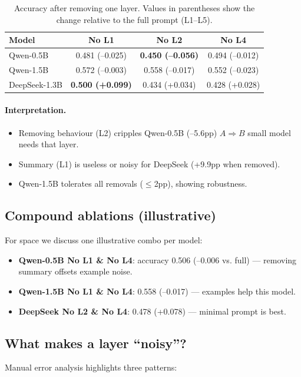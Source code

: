 \documentclass[a4paper]{usiinfbachelorproject}
\begin{document}
\begin{table}[H]\centering
\caption{Accuracy after removing one layer. Values in parentheses show the change relative to the full prompt (L1--L5).}
\begin{tabular}{lccc}
\toprule
\textbf{Model} & \textbf{No L1} & \textbf{No L2} & \textbf{No L4} \\ \midrule
Qwen-0.5B  & 0.481 (–0.025) & \textbf{0.450 (–0.056)} & 0.494 (–0.012) \\
Qwen-1.5B  & 0.572 (–0.003) & 0.558 (–0.017) & 0.552 (–0.023) \\
DeepSeek-1.3B & \textbf{0.500 (+0.099)} & 0.434 (+0.034) & 0.428 (+0.028) \\
\bottomrule
\end{tabular}
\end{table}

\paragraph*{Interpretation.}
\begin{itemize}[leftmargin=12pt,itemsep=0pt]
  \item Removing behaviour (L2) cripples Qwen-0.5B (–5.6pp) $A \Rightarrow B$
 small model needs that layer.  
  \item Summary (L1) is useless or noisy for DeepSeek (+9.9pp when removed).  
  \item Qwen-1.5B tolerates all removals ($\leq$2pp), showing robustness.
\end{itemize}

\subsection{Compound ablations (illustrative)}

For space we discuss one illustrative combo per model:

\begin{itemize}[leftmargin=12pt]
  \item \textbf{Qwen-0.5B No L1 \& No L4}: accuracy 0.506 (–0.006 vs. full) — removing summary offsets example noise.  
  \item \textbf{Qwen-1.5B No L1 \& No L4}: 0.558 (–0.017) — examples help this model.  
  \item \textbf{DeepSeek No L2 \& No L4}: 0.478 (+0.078) — minimal prompt is best.  
\end{itemize}

\subsection{What makes a layer “noisy”?}
Manual error analysis highlights three patterns:
\end{document}
